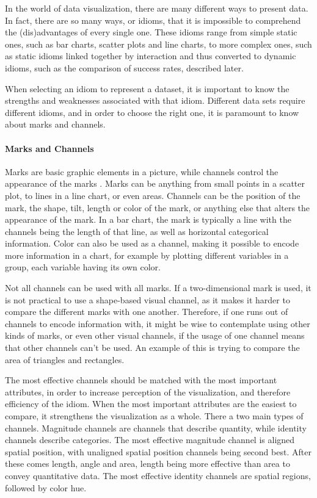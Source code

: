 \documentclass[Report.tex]{subfiles}
\begin{document}
In the world of data visualization, there are many different ways to present
data. In fact, there are so many ways, or idioms, that it is impossible to
comprehend the (dis)advantages of every single one. These idioms range from
simple static ones, such as bar charts, scatter plots and line charts, to
more complex ones, such as static idioms linked together by interaction and thus converted to dynamic idioms,
such as the comparison of success rates, described later. 

When selecting an idiom to represent a dataset, it is important to know the
strengths and weaknesses associated with that idiom. Different data sets
require different idioms, and in order to choose the right one, it is paramount
to know about marks and channels. 
\paragraph{Marks and Channels\\}
Marks are basic graphic elements in a picture, while channels control the
appearance of the marks \cite[Chapter 5, p. 95-96]{Tamara}. Marks can be anything 
from small points in a scatter plot, to lines in a line
chart, or even areas. Channels can be the position of the mark, the shape, tilt,
length or color of the mark, or anything else that alters the appearance of the
mark.
In a bar chart, the mark is typically a line with the channels being the length
of that line, as well as horizontal categorical information. Color can also be used as a channel,
making it possible to encode more information in a chart, for example by
plotting different variables in a group, each variable having its own color. 

Not all channels can be used with all marks. If a two-dimensional mark is used, 
it is not practical to use a shape-based visual channel, as it makes it
harder to compare the different marks with one another. Therefore, if one runs out
of channels to encode information with, it might be wise to contemplate using
other kinds of marks, or even other visual channels, if the usage of one channel
means that other channels can't be used. An example of this is trying to compare 
the area of triangles and rectangles.

The most effective channels should be matched with the most important
attributes, in order to increase perception of the visualization, and therefore
efficiency of the idiom. When the most important attributes are the easiest to
compare, it strengthens the visualization as a whole. 
There a two main types of channels. Magnitude channels are channels that describe quantity, 
while identity channels describe categories.
The most effective magnitude channel is
aligned spatial position, with unaligned spatial position channels being second
best. After these comes length, angle and area,
length being more effective than area to convey quantitative data. 
The most effective identity channels are
spatial regions, followed by color hue\cite[Chapter 5, p. 101]{Tamara}.
\end{document}
